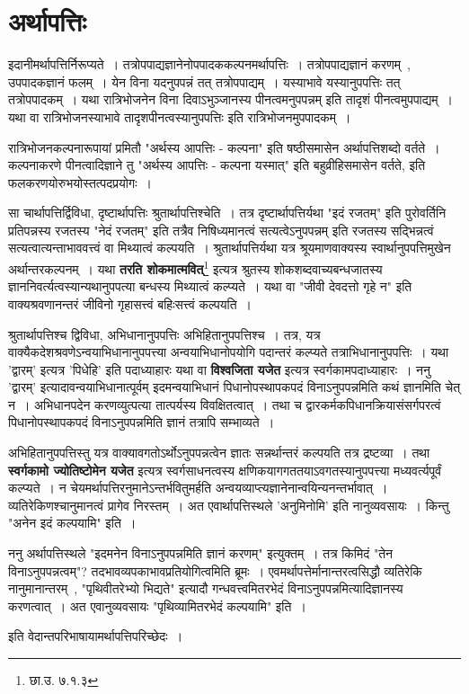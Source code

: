 \section{अर्थापत्तिः}
	इदानीमर्थापत्तिर्निरूप्यते~। तत्रोपपाद्यज्ञानेनोपपादककल्पनमर्थापत्तिः~। तत्रोपपाद्यज्ञानं करणम्~, उपपादकज्ञानं फलम्~। येन विना यदनुपपन्नं तत् तत्रोपपाद्यम्~। यस्याभावे यस्यानुपपत्तिः तत् तत्रोपपादकम्~। यथा रात्रिभोजनेन विना दिवाऽभुञ्जानस्य पीनत्वमनुपपन्नम् इति तादृशं पीनत्वमुपपाद्यम्~। यथा वा रात्रिभोजनस्याभावे तादृशपीनत्वस्यानुपपत्तिः इति रात्रिभोजनमुपपादकम्~।\par
	रात्रिभोजनकल्पनारूपायां प्रमितौ "अर्थस्य आपत्तिः - कल्पना" इति षष्ठीसमासेन अर्थापत्तिशब्दो वर्तते~। कल्पनाकरणे पीनत्वादिज्ञाने तु "अर्थस्य आपत्तिः - कल्पना यस्मात्" इति बहुव्रीहिसमासेन वर्तते, इति फलकरणयोरुभयोस्तत्पदप्रयोगः~।\par
	सा चार्थापत्तिर्द्विविधा, दृष्टार्थापत्तिः श्रुतार्थापत्तिश्चेति~। तत्र दृष्टार्थापत्तिर्यथा "इदं रजतम्" इति पुरोवर्तिनि प्रतिपन्नस्य रजतस्य "नेदं रजतम्" इति तत्रैव निषिध्यमानत्वं सत्यत्वेऽनुपपन्नम् इति रजतस्य सद्भिन्नत्वं सत्यत्वात्यन्ताभाववत्त्वं वा मिथ्यात्वं कल्पयति~। श्रुतार्थापत्तिर्यथा यत्र श्रूयमाणवाक्यस्य स्वार्थानुपपत्तिमुखेन अर्थान्तरकल्पनम्~। यथा {\bfseries तरति शोकमात्मवित्}\footnote{छा.उ. ७.१.३} इत्यत्र श्रुतस्य शोकशब्दवाच्यबन्धजातस्य ज्ञाननिवर्त्यत्वस्यान्यथानुपपत्या बन्धस्य मिथ्यात्वं कल्प्यते~। यथा वा "जीवी देवदत्तो गृहे न" इति वाक्यश्रवणानन्तरं जीविनो गृहासत्त्वं बहिःसत्त्वं कल्पयति~।\par
	श्रुतार्थापत्तिश्च द्विविधा, अभिधानानुपपत्तिः अभिहितानुपपत्तिश्च~। तत्र, यत्र वाक्यैकदेशश्रवणेऽन्वयाभिधानानुपपत्त्या अन्वयाभिधानोपयोगि पदान्तरं कल्प्यते तत्राभिधानानुपपत्तिः~। यथा 'द्वारम्' इत्यत्र 'पिधेहि' इति पदाध्याहारः यथा वा {\bfseries विश्वजिता यजेत} इत्यत्र स्वर्गकामपदाध्याहारः~।
	ननु 'द्वारम्' इत्यादावन्वयाभिधानात्पूर्वम् इदमन्वयाभिधानं पिधानोपस्थापकपदं विनाऽनुपपन्नमिति कथं ज्ञानमिति चेत् न~। अभिधानपदेन करणव्युत्पत्या तात्पर्यस्य विवक्षितत्वात्~। तथा च द्वारकर्मकपिधानक्रियासंसर्गपरत्वं पिधानोपस्थापकपदं विनाऽनुपपन्नमिति ज्ञानं तत्रापि सम्भाव्यते~।\par
	अभिहितानुपपत्तिस्तु यत्र वाक्यावगतोऽर्थोऽनुपपन्नत्वेन ज्ञातः सन्नर्थान्तरं कल्पयति तत्र द्रष्टव्या~। तथा {\bfseries स्वर्गकामो ज्योतिष्टोमेन यजेत} इत्यत्र स्वर्गसाधनत्वस्य क्षणिकयागगततयाऽवगतस्यानुपपत्त्या मध्यवर्त्यपूर्वं कल्प्यते~।
	न चेयमर्थापत्तिरनुमानेऽन्तर्भवितुमर्हति अन्वयव्याप्त्यज्ञानेनान्वयिन्यनन्तर्भावात्~। व्यतिरेकिणश्चानुमानत्वं प्रागेव निरस्तम्~। अत एवार्थापत्तिस्थले 'अनुमिनोमि' इति नानुव्यवसायः~। किन्तु "अनेन इदं कल्पयामि" इति~।\par
	ननु अर्थापत्तिस्थले "इदमनेन विनाऽनुपपन्नमिति ज्ञानं करणम्" इत्युक्तम्~। तत्र किमिदं "तेन विनाऽनुपपन्नत्वम्"? तदभावव्यपकाभावप्रतियोगित्वमिति ब्रूमः~। एवमर्थापत्तेर्मानान्तरत्वसिद्धौ व्यतिरेकि नानुमानान्तरम्~, "पृथिवीतरेभ्यो भिद्यते" इत्यादौ गन्धवत्त्वमितरभेदं विनाऽनुपपन्नमित्यादिज्ञानस्य करणत्वात्~। अत एवानुव्यवसायः "पृथिव्यामितरभेदं कल्पयामि" इति~।\\
	\begin{center} इति वेदान्तपरिभाषायामर्थापत्तिपरिच्छेदः~।\end{center}
